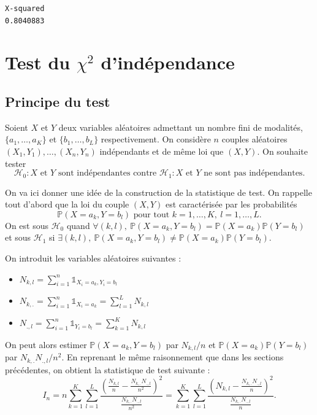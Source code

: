 \documentclass[
]{book}
\providecommand{\tightlist}{%
  \setlength{\itemsep}{0pt}\setlength{\parskip}{0pt}}
\theoremstyle{definition}
\theoremstyle{definition}
\theoremstyle{definition}
\theoremstyle{definition}
\theoremstyle{remark}
\begin{document}
\begin{verbatim}
X-squared 
0.8040883 
\end{verbatim}

\hypertarget{test-du-chi2-dinduxe9pendance}{%
\section{\texorpdfstring{Test du \(\chi^2\) d'indépendance}{Test du \textbackslash chi\^{}2 d'indépendance}}\label{test-du-chi2-dinduxe9pendance}}

\hypertarget{principe-du-test-1}{%
\subsection{Principe du test}\label{principe-du-test-1}}

Soient \(X\) et \(Y\) deux variables aléatoires admettant un nombre fini de modalités, \(\{a_1,\ldots,a_K\}\) et \(\{b_1,\ldots,b_L\}\) respectivement. On considère \(n\) couples aléatoires \((X_1,Y_1),\ldots,(X_n,Y_n)\) indépendants et de même loi que \((X,Y)\).
On souhaite tester
\[
\mathcal{H}_0 : X \textrm{ et } Y \textrm{ sont indépendantes contre } \mathcal{H}_1 : X \textrm{ et } Y \textrm{ ne sont pas indépendantes}. 
\]

On va ici donner une idée de la construction de la statistique de test. On rappelle tout d'abord que la loi du couple \((X,Y)\) est caractérisée par les probabilités
\[
    \mathbb{P}(X=a_k,Y=b_l) \textrm{ pour tout } k=1,\ldots,K,\ l=1,\ldots,L.
\]
On est sous \(\mathcal{H}_0\) quand \(\forall (k,l),\ \mathbb{P}(X=a_k, Y=b_l) = \mathbb{P}(X=a_k) \mathbb{P}(Y=b_l)\) et sous \(\mathcal{H}_1\) si \(\exists (k,l),\ \mathbb{P}(X=a_k, Y=b_l) \neq \mathbb{P}(X=a_k) \mathbb{P}(Y=b_l)\).

On introduit les variables aléatoires suivantes :

\begin{itemize}
\tightlist
\item
  \(N_{k,l} = \sum_{i=1}^n \mathbb{1}_{X_i = a_k, Y_i = b_l}\)
\item
  \(N_{k,.} = \sum_{i=1}^n \mathbb{1}_{X_i = a_k} = \sum_{l=1}^L N_{k,l}\)
\item
  \(N_{.,l} = \sum_{i=1}^n \mathbb{1}_{Y_i = b_l} = \sum_{k=1}^K N_{k,l}\)
\end{itemize}

On peut alors estimer \(\mathbb{P}(X=a_k, Y=b_l)\) par \(N_{k,l}/n\) et \(\mathbb{P}(X=a_k) \mathbb{P}(Y=b_l)\) par \(N_{k,.} N_{.,l} / n^2\). En reprenant le même raisonnement que dans les sections précédentes, on obtient la statistique de test suivante :
\[
I_n = n \sum_{k=1}^K \sum_{l=1}^L \frac{\left(\frac{N_{k,l}}{n}    -  \frac{N_{k,.} N_{.,l}}{n^2}   \right)^2}{ \frac{N_{k,.} N_{.,l}}{n^2} } = \sum_{k=1}^K \sum_{l=1}^L \frac{\left(N_{k,l}    -  \frac{N_{k,.} N_{.,l}}{n}   \right)^2}{ \frac{N_{k,.} N_{.,l}}{n} }. 
\]
\end{document}
